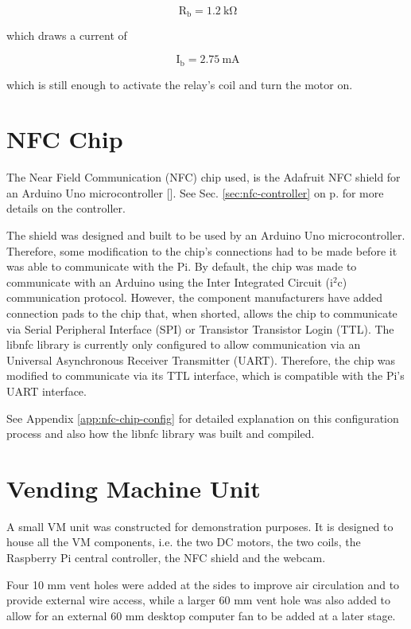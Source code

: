 \[\mathrm{\ R_{b}} = 1.2\mathrm{\ k\Omega}\]

which draws a current of 

\[\mathrm{\ I_{b}} = 2.75\mathrm{\ mA} \]

which is still enough to activate the relay's coil and turn the motor on. 

\section{NFC Chip}

The Near Field Communication (NFC) chip used, is the Adafruit NFC shield for an
Arduino Uno microcontroller [\cite{website:adafruit-nfc}]. See Sec.
\ref{sec:nfc-controller} on p.\pageref{sec:nfc-controller} for more details
on the controller.

The shield was designed and built to be used by an Arduino Uno microcontroller.
Therefore, some modification to the chip's connections had to be made before it
was able to communicate with the Pi. By default, the chip was made to communicate with an
Arduino using the Inter Integrated Circuit (i$^2$c) communication protocol. However, the
component manufacturers have added connection pads to the chip that, when shorted, allows
the chip to communicate via Serial Peripheral Interface (SPI) or Transistor
Transistor Login (TTL). The libnfc library is currently only configured to allow
communication via an Universal Asynchronous Receiver Transmitter (UART). Therefore, the
chip was modified to communicate via its TTL interface, which is compatible with the Pi's
UART interface. 

See Appendix \ref{app:nfc-chip-config} for detailed explanation on this
configuration process and also how the libnfc library was built and compiled. 

\section{Vending Machine Unit}

A small VM unit was constructed for demonstration purposes. It is
designed to house all the VM components, i.e. the two DC motors,
the two coils, the Raspberry Pi central controller, the NFC shield and the
webcam.

Four 10 mm vent holes were added at the sides to improve air circulation
and to provide external wire access, while a larger 60 mm vent hole was also
added to allow for an external 60 mm desktop computer fan to be added at a
later stage.

